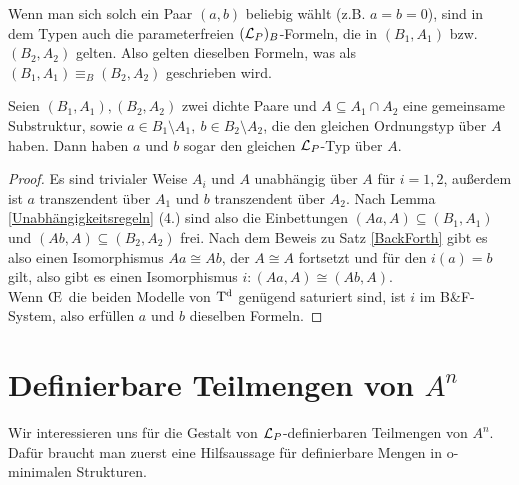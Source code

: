 \begin{corollary}
	Wenn man sich solch ein Paar $(a,b)$ beliebig wählt (z.B. $a=b=0$), sind in dem Typen auch die parameterfreien $(\mathcal{L}_P)_B$-Formeln, die in $(B_1,A_1)$ bzw. $(B_2,A_2)$ gelten. Also gelten dieselben Formeln, was als $(B_1,A_1)\equiv_B(B_2,A_2)$ geschrieben wird.
\end{corollary}

\begin{lemma}\label{selber Schnitt}
	Seien $(B_1,A_1),(B_2,A_2)$ zwei dichte Paare und $A\subseteq A_1\cap A_2$ eine gemeinsame Substruktur, sowie $a\in B_1\setminus A_1,\ b\in B_2\setminus A_2$, die den gleichen Ordnungstyp über $A$ haben. Dann haben $a$ und $b$ sogar den gleichen $\mathcal{L}_P$-Typ über $A$.
\end{lemma}
\begin{proof}
	Es sind trivialer Weise $A_i$ und $A$ unabhängig über $A$ für $i=1,2$, außerdem ist $a$ transzendent über $A_1$ und $b$ transzendent über $A_2$. Nach Lemma \ref{Unabhängigkeitsregeln} (4.) sind also die Einbettungen $(Aa,A)\subseteq(B_1,A_1)$ und $(Ab,A)\subseteq(B_2,A_2)$ frei. Nach dem Beweis zu Satz \ref{BackForth} gibt es also einen Isomorphismus $Aa\cong Ab$, der $A\cong A$ fortsetzt und für den $i(a)=b$ gilt, also gibt es einen Isomorphismus $i:(Aa,A)\cong(Ab,A)$.\\ Wenn \OE\ die beiden Modelle von $\operatorname{T^d}$ genügend saturiert sind, ist $i$ im B\&F-System, also erfüllen $a$ und $b$ dieselben Formeln.
\end{proof}

\newpage

\section{Definierbare Teilmengen von $A^n$}
Wir interessieren uns für die Gestalt von $\mathcal{L}_P$-definierbaren Teilmengen von $A^n$. Dafür braucht man zuerst eine Hilfsaussage für definierbare Mengen in o-minimalen Strukturen.

